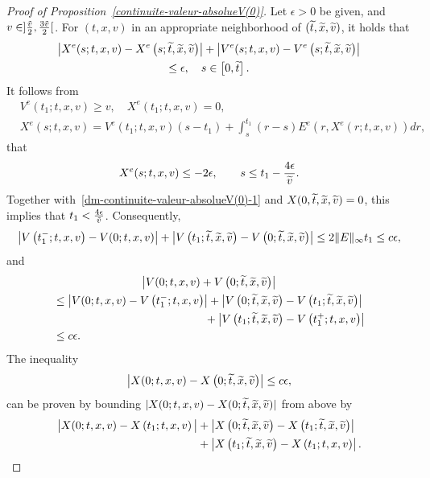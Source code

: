 \documentclass[AHL,Unicode,longabstracts,published]{cedram}
\let\oldtilde\tilde
\renewcommand*{\tilde}[1]{\mathchoice{\widetilde{#1}}{\widetilde{#1}}{\oldtilde{#1}}{\oldtilde{#1}}}
\begin{document}
\begin{proof}[{Proof of Proposition~\ref{continuite-valeur-absolueV(0)}}]
Let $\epsilon >0$ be given, and $v\in]
\frac{\tilde{v}}{2},\frac{3\tilde{v}}{2}[$. For $(t,x,v)$ in an appropriate neighborhood of $(\tilde{t},\tilde{x},\tilde{v})$, it holds that
\begin{multline}\label{dm-continuite-valeur-absolueV(0)-1}
\left|X^e(s;t,x,v)-X^e\left(s;\tilde{t},\tilde{x},\tilde{v}\right)\right|+\left|V^e(s;t,x,v)-V^e\left(s;\tilde{t},\tilde{x},\tilde{v}\right)\right|\\
\leq \epsilon, \quad s \in \left[0,\tilde{t}\right].
\end{multline}
It follows from
\begin{align*}
&V^e(t_1;t,x,v)\geq v,\quad X^e(t_1;t,x,v)= 0,\\
&X^e(s;t,x,v)= V^e(t_1;t,x,v)(s-t_1)+\int _s^{t_1}(r-s) E^e\left(r,X^e(r;t,x,v)\right)dr,
\end{align*}
that
\[
X^e(s;t,x,v)\leq -2\epsilon, \qquad s \leq t_1 - \frac{4\epsilon }{\tilde{v}}.
\]
Together with~\eqref{dm-continuite-valeur-absolueV(0)-1} and $X(0,\tilde{t},\tilde{x},\tilde{v})= 0$, this implies that $t_1<\frac{4\epsilon }{\tilde{v}}$. Consequently,
\[
\left|V\left(t_1^-;t,x,v\right)-V(0;t,x,v)\right| + \left|V\left(t_1;\tilde{t},\tilde{x},\tilde{v}\right)-V\left(0;\tilde{t},\tilde{x},\tilde{v}\right)\right| \leq 2 \|E\|_{\infty} t_1 \leq c\epsilon,
\]
and
\begin{multline*}
\left| V(0;t,x,v)+V\left(0;\tilde{t},\tilde{x},\tilde{v}\right)\right| \\
\begin{aligned}
&\leq \left| V(0;t,x,v)-V\left(t_1^-;t,x,v\right) \right| + \left| V\left(0;\tilde{t},\tilde{x},\tilde{v}\right)-V\left(t_1;\tilde{t},\tilde{x},\tilde{v}\right)\right|\\
&\mkern243mu+ \left|V\left(t_1;\tilde{t},\tilde{x},\tilde{v}\right)-V\left(t_1^+;t,x,v\right)\right| \\
&\leq c\epsilon.
\end{aligned}
\end{multline*}
The inequality
\[
\left|X(0;t,x,v)-X\left(0;\tilde{t},\tilde{x},\tilde{v}\right)\right| \leq c\epsilon,
\]
can be proven by bounding $|X(0;t,x,v)-X(0;\tilde{t},\tilde{x},\tilde{v})|$ from above by
\begin{align*}
\big|X(0;t,x,v)-X\left(t_1;t,x,v\right)\big| &+ \left|X\left(0;\tilde{t},\tilde{x},\tilde{v}\right)-X\left(t_1;\tilde{t},\tilde{x},\tilde{v}\right)\right|\\
 &+ \left|X\left(t_1;\tilde{t},\tilde{x},\tilde{v}\right)-X\left(t_1;t,x,v\right)\right|.
\end{align*}

\end{proof}
\end{document}
